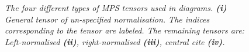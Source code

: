 \begin{figure}[h!]
\centering %
\begin{subfigure}[t]{0.2\textwidth}
	\caption{}  	
  	
\end{subfigure}
\hspace{5mm}
\begin{subfigure}[t]{0.2\textwidth}    
	\caption{}  	
  	
\end{subfigure}
\hspace{5mm}
\begin{subfigure}[t]{0.2\textwidth}    
	\caption{}  	
  	
\end{subfigure}
\hspace{5mm}
\begin{subfigure}[t]{0.2\textwidth}    
	\caption{}  	
  	
\end{subfigure}
\caption{\textit{The four different types of MPS tensors used in diagrams. \textbf{(i)} General tensor of un-specified normalisation. The indices corresponding to the tensor are labeled. The remaining tensors are: Left-normalised \textbf{(ii)}, right-normalised \textbf{(iii)}, central cite \textbf{(iv)}. }}
\label{fig:MPStensors}
\end{figure}
	
